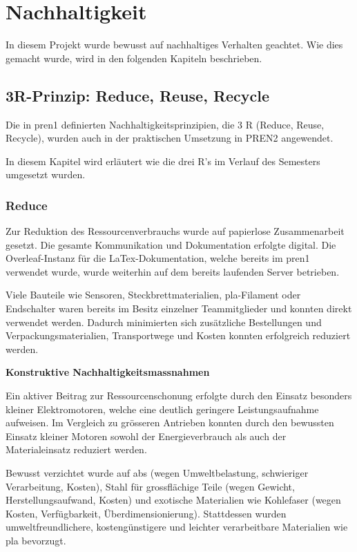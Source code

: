\section{Nachhaltigkeit}
\label{nachhaltigkeit}

In diesem Projekt wurde bewusst auf nachhaltiges Verhalten geachtet. Wie dies gemacht wurde, wird in den folgenden Kapiteln beschrieben.

\subsection{3R-Prinzip: Reduce, Reuse, Recycle}

Die in \acrshort{pren1} definierten Nachhaltigkeitsprinzipien, die 3 R (Reduce, Reuse, Recycle), wurden auch in der praktischen Umsetzung in PREN2 angewendet.  

 In diesem Kapitel wird erläutert wie die drei R's im Verlauf des Semesters umgesetzt wurden.

\subsubsection{Reduce}

Zur Reduktion des Ressourcenverbrauchs wurde auf papierlose Zusammenarbeit gesetzt. Die gesamte Kommunikation und Dokumentation erfolgte digital. Die Overleaf-Instanz für die LaTex-Dokumentation, welche bereits im \acrshort{pren1} verwendet wurde, wurde weiterhin auf dem bereits laufenden Server betrieben.

Viele Bauteile wie Sensoren, Steckbrettmaterialien, \acrshort{pla}-Filament oder Endschalter waren bereits im Besitz einzelner Teammitglieder und konnten direkt verwendet werden. Dadurch minimierten sich zusätzliche Bestellungen und Verpackungsmaterialien, Transportwege und Kosten konnten erfolgreich reduziert werden.

\textbf{Konstruktive Nachhaltigkeitsmassnahmen}

Ein aktiver Beitrag zur Ressourcenschonung erfolgte durch den Einsatz besonders kleiner Elektromotoren, welche eine deutlich geringere Leistungsaufnahme aufweisen. Im Vergleich zu grösseren Antrieben konnten durch den bewussten Einsatz kleiner Motoren sowohl der Energieverbrauch als auch der Materialeinsatz reduziert werden. 

Bewusst verzichtet wurde auf \acrshort{abs} (wegen Umweltbelastung, schwieriger Verarbeitung, Kosten), Stahl für grossflächige Teile (wegen Gewicht, Herstellungsaufwand, Kosten) und exotische Materialien wie Kohlefaser (wegen Kosten, Verfügbarkeit, Überdimensionierung). Stattdessen wurden umweltfreundlichere, kostengünstigere und leichter verarbeitbare Materialien wie \acrshort{pla} bevorzugt.\cite{pla}



